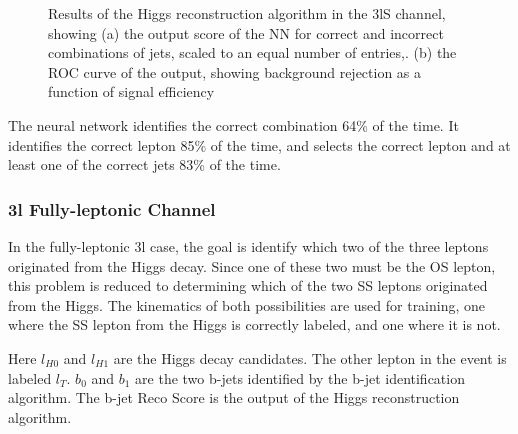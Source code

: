 \begin{figure}[h!]
  \label{fig:higgs3lSresults}
  \caption{Results of the Higgs reconstruction algorithm in the 3lS channel, showing (a) the output score of the NN for correct and incorrect combinations of jets, scaled to an equal number of entries,. (b) the ROC curve of the output, showing background rejection as a function of signal efficiency}
\end{figure} 

The neural network identifies the correct combination 64\% of the time. It identifies the correct lepton 85\% of the time, and selects the correct lepton and at least one of the correct jets 83\% of the time.


\subsubsection{3l Fully-leptonic Channel}
\label{subsec:higgs3lF}

In the fully-leptonic 3l case, the goal is identify which two of the three leptons originated from the Higgs decay. Since one of these two must be the OS lepton, this problem is reduced to determining which of the two SS leptons originated from the Higgs. The kinematics of both possibilities are used for training, one where the SS lepton from the Higgs is correctly labeled, and one where it is not.



Here $l_{H0}$ and $l_{H1}$ are the Higgs decay candidates. The other lepton in the event is labeled $l_T$. $b_0$ and $b_1$ are the two b-jets identified by the b-jet identification algorithm. The b-jet Reco Score is the output of the Higgs reconstruction algorithm. 

